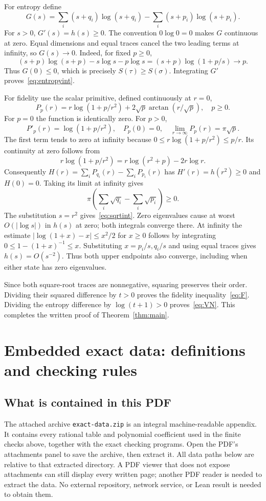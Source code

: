 \documentclass[11pt,a4paper]{article}
\begin{document}
For entropy define
\[
 G(s)=\sum_i(s+q_i)\log(s+q_i)-\sum_i(s+p_i)\log(s+p_i).
\]
For $s>0$, $G'(s)=h(s)\ge0$. The convention $0\log0=0$ makes
$G$ continuous at zero. Equal dimensions and equal traces cancel the
two leading terms at infinity, so $G(s)\to0$. Indeed, for fixed $p\ge0$,
\[
 (s+p)\log(s+p)-s\log s-p\log s
   =(s+p)\log(1+p/s)\longrightarrow p.
\]
Thus $G(0)\le0$, which is precisely $S(\tau)\ge S(\sigma)$.
Integrating $G'$ proves~\eqref{eq:entropyint}.

For fidelity use the scalar primitive, defined continuously at $r=0$,
\[
 P_p(r)=r\log(1+p/r^2)
       +2\sqrt p\arctan(r/\sqrt p),\quad p\ge0.
\]
For $p=0$ the function is identically zero. For $p>0$,
\[
 P'_p(r)=\log(1+p/r^2),\quad
 P_p(0)=0,\quad
 \lim_{r\to\infty}P_p(r)=\pi\sqrt p.
\]
The first term tends to zero at infinity because
$0\le r\log(1+p/r^2)\le p/r$.
Its continuity at zero follows from
\[
 r\log(1+p/r^2)=r\log(r^2+p)-2r\log r.
\]
Consequently $H(r)=\sum_iP_{q_i}(r)-\sum_iP_{p_i}(r)$ has
$H'(r)=h(r^2)\ge0$ and $H(0)=0$. Taking its limit at infinity gives
\[
 \pi\left(\sum_i\sqrt{q_i}-\sum_i\sqrt{p_i}\right)\ge0.
\]
The substitution $s=r^2$ gives~\eqref{eq:sqrtint}.
Zero eigenvalues cause at worst $O(|\log s|)$ in $h(s)$ at zero;
both integrals converge there. At infinity the estimate
$|\log(1+x)-x|\le x^2/2$ for $x\ge0$ follows by integrating
$0\le1-(1+x)^{-1}\le x$. Substituting $x=p_i/s,q_i/s$ and
using equal traces gives $h(s)=O(s^{-2})$. Thus both upper endpoints
also converge, including when either state has zero eigenvalues.

Since both square-root traces are nonnegative, squaring preserves
their order. Dividing their squared difference by $t>0$ proves
the fidelity inequality~\eqref{eq:F}. Dividing the entropy difference
by $\log(t+1)>0$ proves~\eqref{eq:VN}. This completes the
written proof of Theorem~\ref{thm:main}.


\section{Embedded exact data: definitions and checking rules}\label{sec:data}
\subsection{What is contained in this PDF}
The attached archive \texttt{exact-data.zip} is an integral machine-readable
appendix. It contains every rational table and polynomial coefficient used
in the finite checks above, together with the exact checking programs.
Open the PDF's attachments panel to save the archive, then extract it.
All data paths below are relative to that extracted directory. A PDF
viewer that does not expose attachments can still display every written
page; another PDF reader is needed to extract the data. No external
repository, network service, or Lean result is needed to obtain them.
\end{document}
